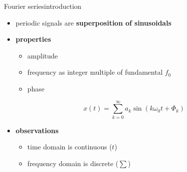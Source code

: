     \begin{frame}{Fourier series}{introduction}
        \begin{itemize}
            \item   periodic signals are \textbf{superposition of sinusoidals}
            \smallskip
            \item<2-> \textbf{properties}
                \begin{itemize}
                    \item   amplitude
                    \item   frequency as integer multiple of fundamental $f_0$
                    \item   phase
                \end{itemize}
                \begin {equation*}
                    x(t) = \sum\limits_{k=0}^{\infty} a_k \sin(k\omega_0 t + \Phi_k) \nonumber
                \end {equation*}
            \smallskip
            \item<3->   \textbf{observations}
                \begin{itemize}
                    \item   time domain is continuous ($t$)
                    \item   frequency domain is discrete ($\sum$)
                \end{itemize}
        \end{itemize}
    \end{frame}

